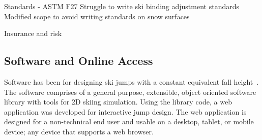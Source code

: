\documentclass{article}
\begin{document}
Standards - ASTM F27
Struggle to write ski binding adjustment standards
Modified scope to avoid writing standards on snow surfaces

Insurance and risk 

\subsection{Software and Online Access}
%
Software has been for designing ski jumps with a constant
equivalent fall height~\cite{Moore2018}. The software comprises of a general
purpose, extensible, object oriented software library with tools for 2D skiing
simulation. Using the library code, a web application was developed for
interactive jump design. The web application is designed for a non-technical
end user and usable on a desktop, tablet, or mobile device; any device that
supports a web browser.
\end{document}
